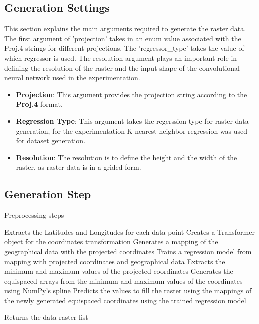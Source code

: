 \subsection{Generation Settings}
This section explains the main arguments required to generate the raster data. The first argument of 'projection' takes in an enum value associated with the Proj.4 strings for different projections. The 'regressor\_type' takes the value of which regressor is used. The resolution argument plays an important role in defining the resolution of the raster and the input shape of the convolutional neural network used in the experimentation.
\begin{itemize}
    \item \textbf{Projection}: This argument provides the projection string according to the \textbf{Proj.4} format.
    \item  \textbf{Regression Type}: This argument takes the regerssion type for raster data generation, for the experimentation K-nearest neighbor regression was used for dataset generation.
    \item \textbf{Resolution}: The resolution is to define the height and the width of the raster, as raster data is in a grided form.
\end{itemize}


\subsection{Generation Step}
\begin{algorithm}
    \caption{Preprocessing steps}
    \label{}
    \begin{algorithmic}[1]
        \STATE Extracts the Latitudes and Longitudes for each data point
        \STATE Creates a Transformer object for the coordinates transformation
        \STATE Generates a mapping of the geographical data with the projected coordinates
        \STATE Trains a regression model from mapping with projected coordinates and geographical data
        \STATE Extracts the minimum and maximum values of the projected coordinates
        \STATE Generates the equispaced arrays from the minimum and maximum values of the coordinates using NumPy's spline
        \STATE Predicts the values to fill the raster using the mappings of the newly generated equispaced coordinates  using the trained regression model

        \ENDFOR
        \STATE Returns the data raster list
    \end{algorithmic}
\end{algorithm}